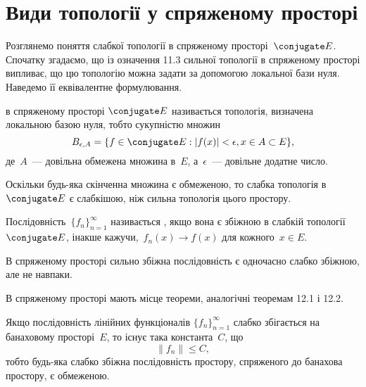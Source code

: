 \section{Види топології у спряженому просторі}

Розглянемо поняття слабкої топології в спряженому
просторі~$\conjugate E$. Спочатку згадаємо, що із означення 11.3 сильної
топології в спряженому просторі випливає, що цю топологію
можна задати за допомогою локальної бази нуля. Наведемо її
еквівалентне формулювання.

\begin{definition}
 в спряженому просторі
$\conjugate E$ називається топологія, визначена локальною базою нуля,
тобто сукупністю множин
\begin{equation*}
    B_{\epsilon, A} = \{ f \in \conjugate E: |f(x)| < \epsilon, x \in A \subset E\},
\end{equation*}
де~$A$~--- довільна обмежена множина в~$E$, а~$\epsilon$~--- довільне
додатне число.
\end{definition}

\begin{remark}
Оскільки будь-яка скінченна множина є
обмеженою, то слабка топологія в~$\conjugate E$ є слабкішою, ніж
сильна топологія цього простору.
\end{remark}

\begin{definition}
Послідовність~$\{f_n\}_{n = 1}^\infty$
називається ,
якщо вона є збіжною в слабкій топології~$\conjugate E$,
інакше кажучи,~$f_n(x) \to f(x)$ для кожного~$x \in E$.
\end{definition}

\begin{remark}
В спряженому просторі сильно збіжна
послідовність є одночасно слабко збіжною, але не навпаки.
\end{remark}

В спряженому просторі мають місце теореми, аналогічні
теоремам 12.1 і 12.2.

\begin{theorem}
Якщо послідовність лінійних функціоналів
$\{f_n\}_{n = 1}^\infty$
слабко збігається на банаховому просторі~$E$, то
існує така константа~$C$, що
\begin{equation*}
    \|f_n\| \le C,
\end{equation*}
тобто будь-яка слабко збіжна послідовність простору,
спряженого до банахова простору, є обмеженою.
\end{theorem}

